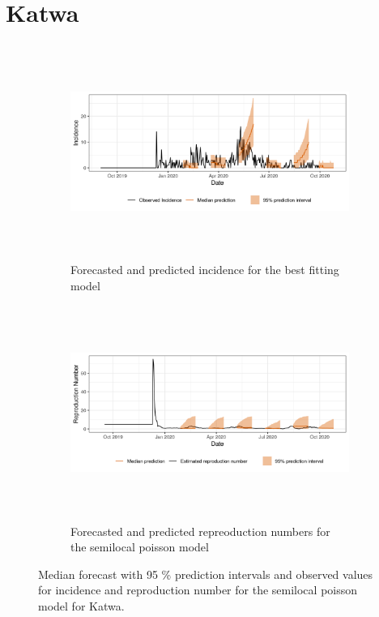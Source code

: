  \section{ Katwa }\begin{figure}[H]\begin{subfigure}{\textwidth}  \centering  \includegraphics[width=0.9\linewidth, height=7cm]{../output/Katwa_predictions.png}  \caption{Forecasted and predicted incidence for the best fitting model}\end{subfigure}

\begin{subfigure}{\textwidth}  \centering  \includegraphics[width=0.9\linewidth, height=7cm]{../output/Katwa_Rs.png}  \caption{Forecasted and predicted repreoduction numbers for the semilocal poisson model}\end{subfigure}  \caption{Median forecast with 95 \% prediction intervals and observed values for incidence and reproduction number for the semilocal poisson model for Katwa.}\end{figure}

